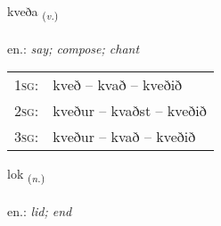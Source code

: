 \documentclass[frontgrid, backgrid]{flacards}\usepackage[]{graphicx}\usepackage[]{xcolor}
\begin{document}
\renewcommand{\flhead}{\vskip5pt \fboxsep=0pt {\small\bfseries\footnotesize Sagnorð | Verb}}
\renewcommand{\fcfoot}{\vskip5pt \fboxsep=0pt \hspace{2pt}{\small\bfseries\footnotesize 1K}}

\renewcommand{\blhead}{\vskip5pt {\small\bfseries\footnotesize Sagnorð | Verb }}
\renewcommand{\bcfoot}{\vskip5pt \hspace{2pt}{\small\bfseries\footnotesize 1K}}


{kveða \small{\textsubscript{(\textit{v.})}} \\[1ex] %
\textphonetic{[kʰvɛːða]} \\
en.: \emph{say; compose; chant} \\  [2ex]
\renewcommand*{\arraystretch}{0.8}
\begin{tabular}{p{1cm}l}
\textsc{1sg}: & kveð -- kvað -- kveðið \\ 
\textsc{2sg}: & kveður -- kvaðst -- kveðið \\ 
\textsc{3sg}: & kveður -- kvað -- kveðið \\ 
\end{tabular}
}

\renewcommand{\flhead}{\vskip5pt \fboxsep=0pt {\small\bfseries\footnotesize Nafnorð | Noun}}
\renewcommand{\fcfoot}{\vskip5pt \fboxsep=0pt \hspace{2pt}{\small\bfseries\footnotesize 1K}}

\renewcommand{\blhead}{\vskip5pt {\small\bfseries\footnotesize Nafnorð | Noun }}
\renewcommand{\bcfoot}{\vskip5pt \hspace{2pt}{\small\bfseries\footnotesize 1K}}


{lok \small{\textsubscript{(\textit{n.})}} \\[1ex] %
\textphonetic{[lɔːk]} \\
en.: \emph{lid; end} \\  [2ex]
\renewcommand*{\arraystretch}{0.8}
}
\end{document}
